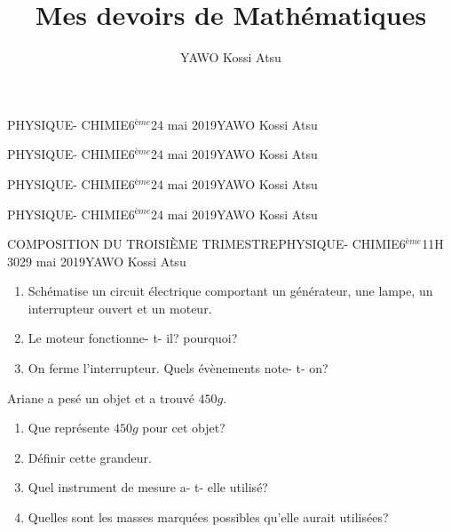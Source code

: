 \documentclass[12pt,a4paper]{book}
\author{YAWO Kossi Atsu}
\title{Mes devoirs de Mathématiques}
\newcommand{\prof}{YAWO Kossi Atsu}
\newcommand{\matiere}{PHYSIQUE- CHIMIE}
\newcommand{\classe}{6$^{ème}$}
\begin{document}
\begin{td}{\matiere}{\classe}{24 mai 2019}{\prof}
\end{td}

\begin{td}{\matiere}{\classe}{24 mai 2019}{\prof}

\end{td}

\begin{td}{\matiere}{\classe}{24 mai 2019}{\prof}

\end{td}

\begin{td}{\matiere}{\classe}{24 mai 2019}{\prof}

\end{td}

\newpage
\begin{devoir}{COMPOSITION DU TROISIÈME TRIMESTRE}{\matiere}{\classe}{1}{1H 30}{29 mai 2019}{\prof}
\begin{exo}[4,5]
\begin{enumerate}
\item Schématise un circuit électrique comportant un générateur, une lampe, un interrupteur ouvert et un moteur.
\item Le moteur fonctionne- t- il? pourquoi?
\item On ferme l'interrupteur. Quels évènements note- t- on?
\end{enumerate}

\vspace{0.2cm}
\end{exo}

\begin{exo}[4]
Ariane a pesé un objet et a trouvé $450g$.
\begin{enumerate}
\item Que représente $450g$ pour cet objet?
\item Définir cette grandeur.
\item Quel instrument de mesure a- t- elle utilisé?
\item Quelles sont les masses marquées possibles qu'elle aurait utilisées?
\end{enumerate}


\end{exo}
\end{devoir}
\end{document}
